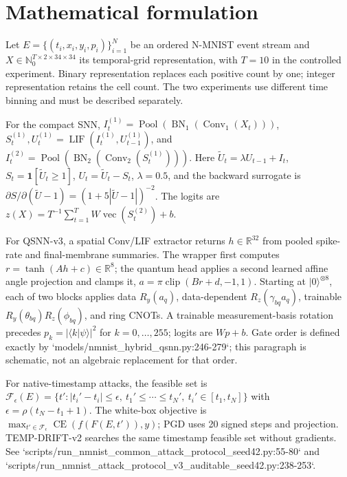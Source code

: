 \section{Mathematical formulation}
Let $E=\{(t_i,x_i,y_i,p_i)\}_{i=1}^N$ be an ordered N-MNIST event stream and $X\in\mathbb{N}_0^{T\times 2\times34\times34}$ its temporal-grid representation, with $T=10$ in the controlled experiment. Binary representation replaces each positive count by one; integer representation retains the cell count. The two experiments use different time binning and must be described separately.

For the compact SNN, $I_t^{(1)}=\operatorname{Pool}(\operatorname{BN}_1(\operatorname{Conv}_1(X_t)))$, $S_t^{(1)},U_t^{(1)}=\operatorname{LIF}(I_t^{(1)},U_{t-1}^{(1)})$, and $I_t^{(2)}=\operatorname{Pool}(\operatorname{BN}_2(\operatorname{Conv}_2(S_t^{(1)})))$. Here $\widetilde U_t=\lambda U_{t-1}+I_t$, $S_t=\mathbf1[\widetilde U_t\ge1]$, $U_t=\widetilde U_t-S_t$, $\lambda=0.5$, and the backward surrogate is $\partial S/\partial(\widetilde U-1)=(1+5|\widetilde U-1|)^{-2}$. The logits are $z(X)=T^{-1}\sum_{t=1}^T W\operatorname{vec}(S_t^{(2)})+b$.

For QSNN-v3, a spatial Conv/LIF extractor returns $h\in\mathbb R^{32}$ from pooled spike-rate and final-membrane summaries. The wrapper first computes $r=\tanh(Ah+c)\in\mathbb R^8$; the quantum head applies a second learned affine angle projection and clamps it, $a=\pi\operatorname{clip}(Br+d,-1,1)$. Starting at $|0\rangle^{\otimes8}$, each of two blocks applies data $R_y(a_q)$, data-dependent $R_z(\gamma_{bq}a_q)$, trainable $R_y(\theta_{bq})R_z(\phi_{bq})$, and ring CNOTs. A trainable measurement-basis rotation precedes $p_k=|\langle k|\psi\rangle|^2$ for $k=0,\ldots,255$; logits are $Wp+b$. Gate order is defined exactly by `models/nmnist_hybrid_qsnn.py:246-279`; this paragraph is schematic, not an algebraic replacement for that order.

For native-timestamp attacks, the feasible set is $\mathcal F_\epsilon(E)=\{t': |t_i'-t_i|\le\epsilon,\ t_1'\le\cdots\le t_N',\ t_i'\in[t_1,t_N]\}$ with $\epsilon=\rho(t_N-t_1+1)$. The white-box objective is $\max_{t'\in\mathcal F_\epsilon}\operatorname{CE}(f(F(E,t')),y)$; PGD uses 20 signed steps and projection. TEMP-DRIFT-v2 searches the same timestamp feasible set without gradients. See `scripts/run_nmnist_common_attack_protocol_seed42.py:55-80` and `scripts/run_nmnist_attack_protocol_v3_auditable_seed42.py:238-253`.

